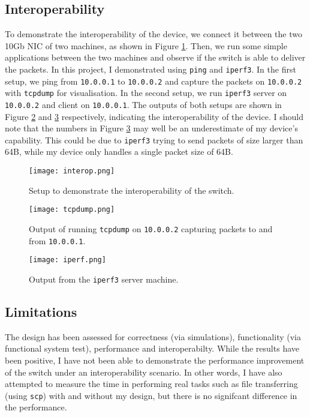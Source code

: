 \subsection{Interoperability}
\label{sec:interop}
To demonstrate the interoperability of the device, we connect it between the two 10Gb NIC of two machines, as shown in Figure \ref{fig:interop}. Then, we run some simple applications between the two machines and observe if the switch is able to deliver the packets. In this project, I demonstrated using \verb|ping| and \verb|iperf3|. In the first setup, we ping from \verb|10.0.0.1| to \verb|10.0.0.2| and capture the packets on \verb|10.0.0.2| with \verb|tcpdump| for visualisation. In the second setup, we run \verb|iperf3| server on \verb|10.0.0.2| and client on \verb|10.0.0.1|. The outputs of both setups are shown in Figure \ref{fig:tcpdump} and \ref{fig:iperf} respectively, indicating the interoperability of the device. I should note that the numbers in Figure \ref{fig:iperf} may well be an underestimate of my device's capability. This could be due to \verb|iperf3| trying to send packets of size larger than 64B, while my device only handles a single packet size of 64B.

\begin{figure}[!h]
	\centering
	\texttt{[image: interop.png]}
	\caption{Setup to demonstrate the interoperability of the switch.}
	\label{fig:interop}
\end{figure}

\begin{figure}[!h]
	\centering
	\texttt{[image: tcpdump.png]}
	\caption{Output of running \texttt{tcpdump} on \texttt{10.0.0.2} capturing packets to and from \texttt{10.0.0.1}.}
	\label{fig:tcpdump}
\end{figure}

\begin{figure}[!h]
	\centering
	\texttt{[image: iperf.png]}
	\caption{Output from the \texttt{iperf3} server machine.}
	\label{fig:iperf}
\end{figure}

\subsection{Limitations}
\label{sec:limit}
The design has been assessed for correctness (via simulations), functionality (via functional system test), performance and interoperabilty. While the results have been positive, I have not been able to demonstrate the performance improvement of the switch under an interoperability scenario. In other words, I have also attempted to measure the time in performing real tasks such as file transferring (using \verb|scp|) with and without my design, but there is no signifcant difference in the performance.
